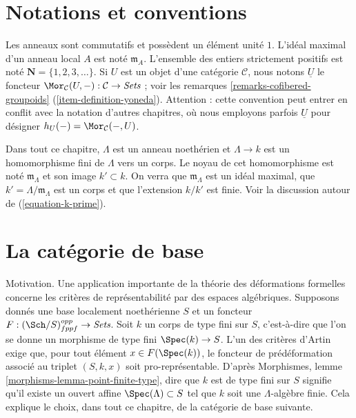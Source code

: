 \section{Notations et conventions}
\label{section-notations-conventions}

\noindent
Les anneaux sont commutatifs et possèdent un élément unité $1$. L'idéal maximal d'un anneau local
$A$ est noté $\mathfrak{m}_A$. L'ensemble des entiers strictement positifs est
noté $\mathbf{N} = \{1, 2, 3, \ldots\}$. Si $U$ est un objet d'une catégorie
$\mathcal{C}$, nous notons $\underline{U}$ le foncteur
$\Mor_\mathcal{C}(U, -): \mathcal{C} \to \textit{Sets}$ ; voir les remarques
\ref{remarks-cofibered-groupoids} (\ref{item-definition-yoneda}). Attention :
cette convention peut entrer en conflit avec la notation d'autres chapitres,
où nous employons parfois $\underline{U}$ pour désigner
$h_U(-) = \Mor_\mathcal{C}(-, U)$.

\medskip\noindent
Dans tout ce chapitre, $\Lambda$ est un anneau noethérien et
$\Lambda \to k$ est un homomorphisme fini de $\Lambda$ vers un corps.
Le noyau de cet homomorphisme est noté $\mathfrak m_\Lambda$ et son image
$k' \subset k$. On verra que $\mathfrak m_\Lambda$ est un idéal maximal,
que $k' = \Lambda/\mathfrak m_\Lambda$ est un corps et que l'extension
$k/k'$ est finie. Voir la discussion autour de
(\ref{equation-k-prime}).


\section{La catégorie de base}
\label{section-CLambda}

\noindent
Motivation. Une application importante de la théorie des déformations formelles
concerne les critères de représentabilité par des espaces algébriques.
Supposons donnés une base localement noethérienne $S$ et un foncteur
$F : (\Sch/S)_{fppf}^{opp} \to \textit{Sets}$.
Soit $k$ un corps de type fini sur $S$, c'est-à-dire que l'on se donne un
morphisme de type fini $\Spec(k) \to S$.
L'un des critères d'Artin exige que, pour tout élément
$x \in F(\Spec(k))$, le foncteur de prédéformation associé au triplet
$(S, k, x)$ soit pro-représentable. D'après Morphismes, lemme
\ref{morphisms-lemma-point-finite-type}, dire que $k$ est de type fini sur
$S$ signifie qu'il existe un ouvert affine $\Spec(\Lambda) \subset S$ tel que
$k$ soit une $\Lambda$-algèbre finie. Cela explique le choix, dans tout ce
chapitre, de la catégorie de base suivante.

